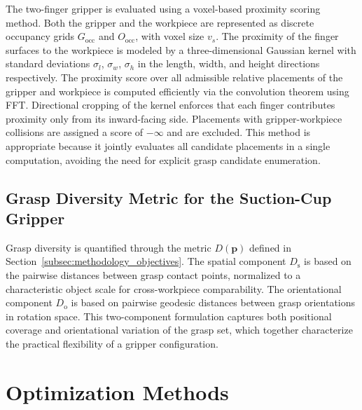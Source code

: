 The two-finger gripper is evaluated using a voxel-based proximity scoring method. Both the gripper and the workpiece are represented as discrete
occupancy grids $G_{\mathrm{occ}}$  and
$O_{\mathrm{occ}}$,  with voxel size
$v_s$. The proximity of the finger surfaces to the
workpiece is modeled by a three-dimensional Gaussian kernel with standard deviations $\sigma_l$, $\sigma_w$, $\sigma_h$ 
in the length, width, and height directions respectively. The proximity score over all admissible relative placements of the gripper and workpiece is
computed efficiently via the convolution theorem using FFT. Directional cropping of the kernel enforces that each finger contributes proximity only
from its inward-facing side. Placements with gripper-workpiece collisions are assigned a score of $-\infty$ and are excluded. This method is
appropriate because it jointly evaluates all candidate placements in a single computation, avoiding the need for explicit grasp candidate enumeration.

\subsection{Grasp Diversity Metric for the Suction-Cup Gripper}

Grasp diversity is quantified through the metric $D(\mathbf{p})$ defined in Section~\ref{subsec:methodology_objectives}. The spatial component
$D_{\mathrm{s}}$ is based on the pairwise distances between grasp contact points, normalized to a characteristic object scale for cross-workpiece
comparability. The orientational component $D_{\mathrm{o}}$ is based on pairwise geodesic distances between grasp orientations in rotation space. This
two-component formulation captures both positional coverage and orientational variation of the grasp set, which together characterize the practical
flexibility of a gripper configuration.

\section{Optimization Methods}
\label{sec:methodology_optimization}


